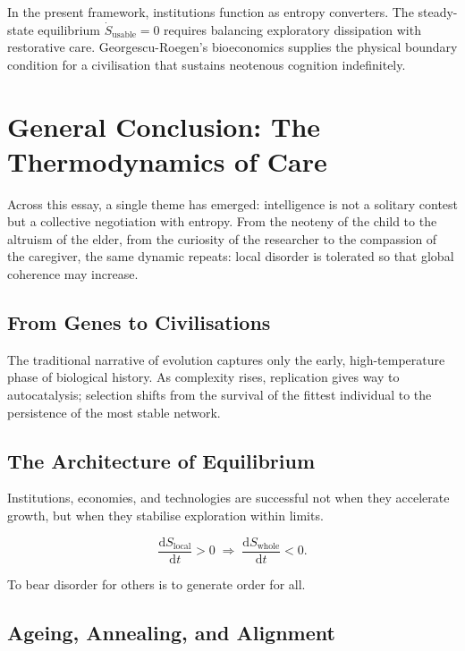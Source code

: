 \documentclass[12pt,a4paper]{article}
\theoremstyle{definition}
\newcommand{\ddt}[1]{\frac{\mathrm{d}#1}{\mathrm{d}t}}
\begin{document}
In the present framework, institutions function as entropy converters.  The
steady-state equilibrium $\dot{S}_{\mathrm{usable}} = 0$ requires balancing
exploratory dissipation with restorative care.  Georgescu-Roegen's bioeconomics
supplies the physical boundary condition for a civilisation that sustains
neotenous cognition indefinitely.

\section{General Conclusion: The Thermodynamics of Care}

Across this essay, a single theme has emerged: intelligence is not a solitary
contest but a collective negotiation with entropy.  From the neoteny of the
child to the altruism of the elder, from the curiosity of the researcher to
the compassion of the caregiver, the same dynamic repeats: local disorder is
tolerated so that global coherence may increase.

\subsection{From Genes to Civilisations}

The traditional narrative of evolution captures only the early, high-temperature
phase of biological history.  As complexity rises, replication gives way to
autocatalysis; selection shifts from the survival of the fittest individual to
the persistence of the most stable network.

\subsection{The Architecture of Equilibrium}

Institutions, economies, and technologies are successful not when they
accelerate growth, but when they stabilise exploration within limits.

\begin{equation}
  \ddt{S_{\mathrm{local}}} > 0
  \;\Longrightarrow\;
  \ddt{S_{\mathrm{whole}}} < 0.
\end{equation}

To bear disorder for others is to generate order for all.

\subsection{Ageing, Annealing, and Alignment}
\end{document}
